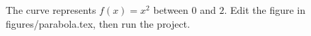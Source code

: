The curve represents $f(x)=x^2$ between $0$ and $2$.
Edit the figure in figures/parabola.tex, then run the project.
